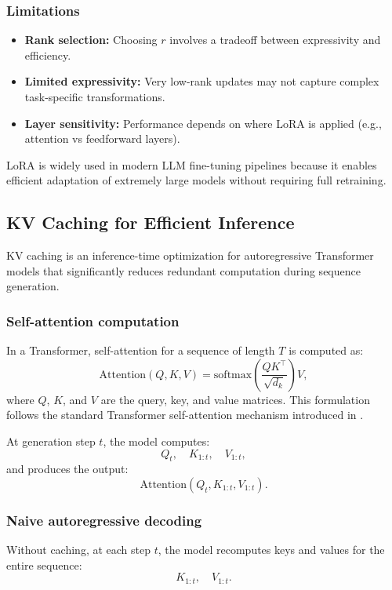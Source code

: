 \documentclass{article}
\begin{document}
\subsubsection{Limitations}

\begin{itemize}
    \item \textbf{Rank selection:} Choosing $r$ involves a tradeoff between expressivity and efficiency.
    \item \textbf{Limited expressivity:} Very low-rank updates may not capture complex task-specific transformations.
    \item \textbf{Layer sensitivity:} Performance depends on where LoRA is applied (e.g., attention vs feedforward layers).
\end{itemize}

LoRA is widely used in modern LLM fine-tuning pipelines because it enables efficient adaptation of extremely large models without requiring full retraining.

\subsection{KV Caching for Efficient Inference}

KV caching is an inference-time optimization for autoregressive Transformer models that significantly reduces redundant computation during sequence generation.

\subsubsection{Self-attention computation}

In a Transformer, self-attention for a sequence of length $T$ is computed as:
\[
\text{Attention}(Q,K,V) = \text{softmax}\left(\frac{QK^\top}{\sqrt{d_k}}\right)V,
\]
where $Q$, $K$, and $V$ are the query, key, and value matrices. This formulation follows the standard Transformer self-attention mechanism introduced in \cite{vaswani2017attention}.

At generation step $t$, the model computes:
\[
Q_t, \quad K_{1:t}, \quad V_{1:t},
\]
and produces the output:
\[
\text{Attention}(Q_t, K_{1:t}, V_{1:t}).
\]

\subsubsection{Naive autoregressive decoding}

Without caching, at each step $t$, the model recomputes keys and values for the entire sequence:
\[
K_{1:t}, \quad V_{1:t}.
\]
\end{document}
